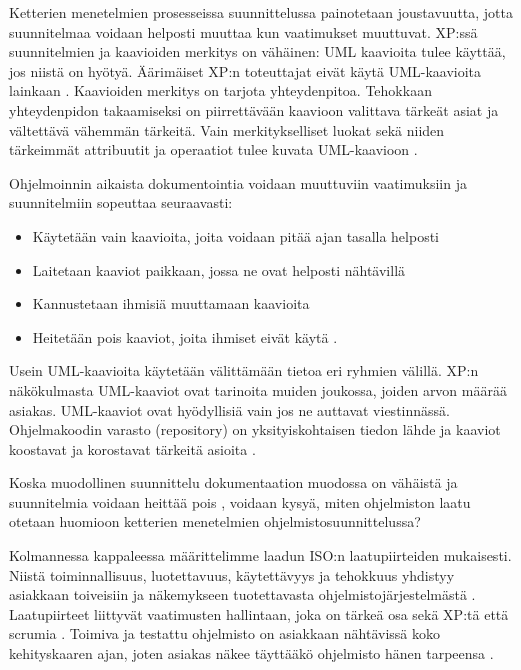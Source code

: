 \documentclass[finnish]{tktltiki2}
\theoremstyle{definition}
\theoremstyle{remark}
\begin{document}
Ketterien menetelmien prosesseissa suunnittelussa painotetaan joustavuutta, jotta suunnitelmaa voidaan helposti muuttaa kun vaatimukset muuttuvat. XP:ssä suunnitelmien ja kaavioiden merkitys on vähäinen: UML kaavioita tulee käyttää, jos niistä on hyötyä. Äärimäiset XP:n toteuttajat eivät käytä UML-kaavioita lainkaan \cite{FOW01b}. Kaavioiden merkitys on tarjota yhteydenpitoa. Tehokkaan yhteydenpidon takaamiseksi on piirrettävään kaavioon valittava tärkeät asiat ja vältettävä vähemmän tärkeitä. Vain merkitykselliset luokat sekä niiden tärkeimmät attribuutit ja operaatiot tulee kuvata UML-kaavioon \cite{FOW01b}.

Ohjelmoinnin aikaista dokumentointia voidaan muuttuviin vaatimuksiin ja suunnitelmiin sopeuttaa seuraavasti:

\begin{itemize}
 \item Käytetään vain kaavioita, joita voidaan pitää ajan tasalla helposti 
 \item Laitetaan kaaviot paikkaan, jossa ne ovat helposti nähtävillä
 \item Kannustetaan ihmisiä muuttamaan kaavioita
 \item Heitetään pois kaaviot, joita ihmiset eivät käytä \cite{FOW01b}.
\end{itemize}

Usein UML-kaavioita käytetään välittämään tietoa eri ryhmien välillä. XP:n näkökulmasta UML-kaaviot ovat tarinoita muiden joukossa, joiden arvon määrää asiakas. UML-kaaviot ovat hyödyllisiä vain jos ne auttavat viestinnässä. Ohjelmakoodin varasto (repository) on yksityiskohtaisen tiedon lähde ja kaaviot koostavat ja korostavat tärkeitä asioita \cite{FOW01b}.

Koska muodollinen suunnittelu dokumentaation muodossa on vähäistä ja suunnitelmia voidaan heittää pois \cite{FOW01b}, voidaan kysyä, miten ohjelmiston laatu otetaan huomioon ketterien menetelmien ohjelmistosuunnittelussa?

Kolmannessa kappaleessa määrittelimme laadun ISO:n laatupiirteiden mukaisesti. Niistä toiminnallisuus, luotettavuus, käytettävyys ja tehokkuus yhdistyy asiakkaan toiveisiin ja näkemykseen tuotettavasta ohjelmistojärjestelmästä \cite{KIP96}. Laatupiirteet liittyvät vaatimusten hallintaan, joka on tärkeä osa sekä XP:tä \cite{BEC99} että scrumia \cite{SCH09}. Toimiva ja testattu ohjelmisto on asiakkaan nähtävissä koko kehityskaaren ajan, joten asiakas näkee täyttääkö ohjelmisto hänen tarpeensa \cite{BEC99}.
\end{document}
